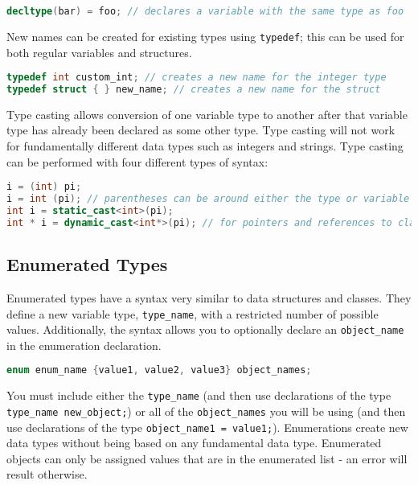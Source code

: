 \documentclass[10pt]{article}
\begin{document}
\begin{lstlisting}[language=C++]
decltype(bar) = foo; // declares a variable with the same type as foo
\end{lstlisting}

New names can be created for existing types using \texttt{typedef}; this can be used for both regular variables and structures.

\begin{lstlisting}[language=C++]
typedef int custom_int; // creates a new name for the integer type
typedef struct { } new_name; // creates a new name for the struct
\end{lstlisting}

Type casting allows conversion of one variable type to another after that variable type has already been declared as some other type. Type casting will not work for fundamentally different data types such as integers and strings. Type casting can be performed with four different types of syntax:

\begin{lstlisting}[language=C++]
i = (int) pi; 
i = int (pi); // parentheses can be around either the type or variable
int i = static_cast<int>(pi);
int * i = dynamic_cast<int*>(pi); // for pointers and references to classes
\end{lstlisting}

\subsection{Enumerated Types}

Enumerated types have a syntax very similar to data structures and classes. They define a new variable type, \texttt{type\_name}, with a restricted number of possible values. Additionally, the syntax allows you to optionally declare an \texttt{object\_name} in the enumeration declaration.

\begin{lstlisting}[language=C++]
enum enum_name {value1, value2, value3} object_names;
\end{lstlisting}

You must include either the \texttt{type\_name} (and then use declarations of the type \texttt{type\_name new\_object;}) or all of the \texttt{object\_names} you will be using (and then use declarations of the type \texttt{object\_name1 = value1;}). Enumerations create new data types without being based on any fundamental data type. Enumerated objects can only be assigned values that are in the enumerated list - an error will result otherwise. 
\end{document}
